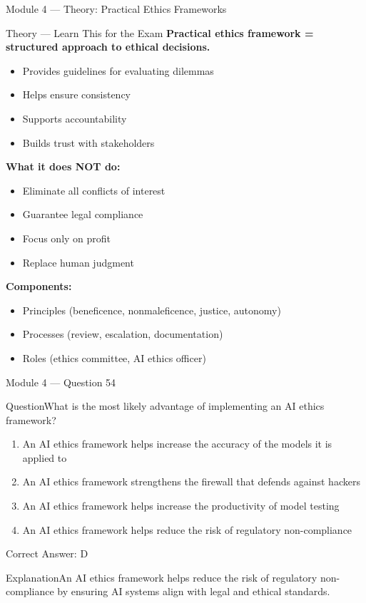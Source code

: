 \documentclass[aspectratio=169,10pt]{beamer}
\newcommand{\question}[1]{\begin{block}{Question}#1\end{block}}
\newcommand{\options}[4]{%
	\begin{enumerate}[label=\Alph*.,leftmargin=*]
		\item #1
		\item #2
		\item #3
		\item #4
	\end{enumerate}
}
\newcommand{\answerbox}[1]{\begin{exampleblock}{Correct Answer: #1}\end{exampleblock}}
\newcommand{\explain}[1]{\begin{block}{Explanation}#1\end{block}}
\newcommand{\theory}[1]{%
	\begin{block}{Theory --- Learn This for the Exam}
		\small #1
	\end{block}
}
\begin{document}
	\begin{frame}{Module 4 --- Theory: Practical Ethics Frameworks}
		\theory{
			\textbf{Practical ethics framework = structured approach to ethical decisions.}
			\begin{itemize}
				\item Provides guidelines for evaluating dilemmas
				\item Helps ensure consistency
				\item Supports accountability
				\item Builds trust with stakeholders
			\end{itemize}
			\textbf{What it does NOT do:}
			\begin{itemize}
				\item Eliminate all conflicts of interest
				\item Guarantee legal compliance
				\item Focus only on profit
				\item Replace human judgment
			\end{itemize}
			\textbf{Components:}
			\begin{itemize}
				\item Principles (beneficence, nonmaleficence, justice, autonomy)
				\item Processes (review, escalation, documentation)
				\item Roles (ethics committee, AI ethics officer)
			\end{itemize}
		}
	\end{frame}
	
	\begin{frame}{Module 4 --- Question 54}
		\question{What is the most likely advantage of implementing an AI ethics framework?}
		\options{An AI ethics framework helps increase the accuracy of the models it is applied to}{An AI ethics framework strengthens the firewall that defends against hackers}{An AI ethics framework helps increase the productivity of model testing}{An AI ethics framework helps reduce the risk of regulatory non-compliance}
		\answerbox{D}
		\explain{An AI ethics framework helps reduce the risk of regulatory non-compliance by ensuring AI systems align with legal and ethical standards.}
	\end{frame}
	
\end{document}
